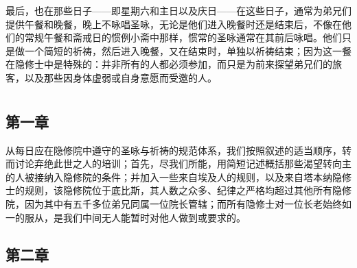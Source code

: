 最后，也在那些日子——即星期六和主日以及庆日——在这些日子，通常为弟兄们提供午餐和晚餐，晚上不咏唱圣咏，无论是他们进入晚餐时还是结束后，不像在他们的常规午餐和斋戒日的惯例小斋中那样，惯常的圣咏通常在其前后咏唱。他们只是做一个简短的祈祷，然后进入晚餐，又在结束时，单独以祈祷结束；因为这一餐在隐修士中是特殊的：并非所有的人都必须参加，而只是为前来探望弟兄们的旅客，以及那些因身体虚弱或自身意愿而受邀的人。\par



\section{}


\subsection{第一章}

\par

从每日应在隐修院中遵守的圣咏与祈祷的规范体系，我们按照叙述的适当顺序，转而讨论弃绝此世之人的培训；首先，尽我们所能，用简短记述概括那些渴望转向主的人被接纳入隐修院的条件；并加入一些来自埃及人的规则，以及来自塔本纳隐修士的规则，该隐修院位于底比斯，其人数之众多、纪律之严格均超过其他所有隐修院，因为其中有五千多位弟兄同属一位院长管辖；而所有隐修士对一位长老始终如一的服从，是我们中间无人能暂时对他人做到或要求的。\par


\subsection{第二章}

\par

